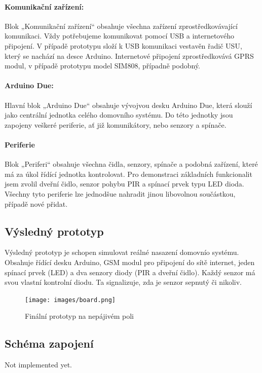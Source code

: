 \documentclass[FM,DP]{tulthesis}  %
\begin{document}
\paragraph{Komunikační zařízení:}
Blok „Komunikační zařízení“ obsahuje všechna zařízení zprostředkovávající komunikaci. Vždy potřebujeme komunikovat pomocí USB a internetového připojení. V případě prototypu složí k USB komunikaci vestavěn řadič USU, který se nachází na desce Arduino. Internetové připojení zprostředkovává GPRS modul, v případě prototypu model SIM808, případně podobný.

\paragraph{Arduino Due:}
Hlavní blok „Arduino Due“ obsahuje vývojvou desku Arduino Due, která slouží jako centrální jednotka celého domovního systému. Do této jednotky jsou zapojeny veškeré periferie, ať již komunikátory, nebo senzory a spínače.

\paragraph{Periferie}
Blok „Periferi“ obsahuje všechna čidla, senzory, spínače a podobná zařízení, které má za úkol řídící jednotka kontrolovat. Pro demonstraci základních funkcionalit jsem zvolil dveřní čidlo, senzor pohybu PIR a spínací prvek typu LED dioda. Všechny tyto periferie lze jednodšue nahradit jinou libovolnou součástkou, případě nové přidat.

\subsection{Výsledný prototyp}
Výsledný prototyp je schopen simulovat reálné nasazení domovnío systému. Obsahuje řídící desku Arduino, GSM modul pro připojení do sítě internet, jeden spínací prvek (LED) a dva senzory diody (PIR a dveřní čidlo). Každý senzor má svou vlastní kontrolní diodu. Ta signalizuje, zda je senzor sepnutý či nikoliv.

\begin{figure}[H]
\begin{center}
\texttt{[image: images/board.png]}
\caption{Finální prototyp na nepájivém poli}
\label{image}
\end{center}
\end{figure}

\subsection{Schéma zapojení}
Not implemented yet.
\end{document}

